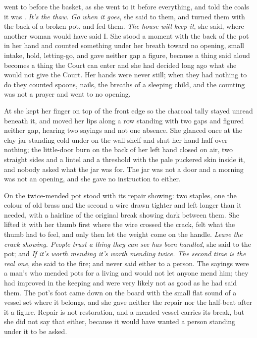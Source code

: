  went to  before the basket, as she went to it before everything, and told the coals it was . \emph{It's the thaw. Go when it goes}, she said to them, and turned them with the back of a broken pot, and fed them. \emph{The house will keep it}, she said, where another woman would have said I. She stood a moment with the back of the pot in her hand and counted something under her breath toward no opening, small intake, hold, letting-go, and gave neither gap a figure, because a thing said aloud becomes a thing the Court can enter and she had decided long ago what she would not give the Court. Her hands were never still; when they had nothing to do they counted spoons, nails, the breaths of a sleeping child, and the counting was not a prayer and went to no opening.

At  she kept her finger on top of the front edge so the charcoal tally stayed unread beneath it, and moved her lips along a row standing with two gaps and figured neither gap, hearing two sayings and not one absence. She glanced once at the clay jar standing cold under  on the wall shelf and shut her hand half over nothing; the little-door burn on the back of her left hand closed on air, two straight sides and a lintel and a threshold with the pale puckered skin inside it, and nobody asked what the jar was for. The jar was not a door and a morning was not an opening, and she gave no instruction to either.

On  the twice-mended pot stood with its repair showing: two staples, one the colour of old brass and the second a wire drawn tighter and left longer than it needed, with a hairline of the original break showing dark between them. She lifted it with her thumb first where the wire crossed the crack, felt what the thumb had to feel, and only then let the weight come on the handle. \emph{Leave the crack showing. People trust a thing they can see has been handled}, she said to the pot; and \emph{If it's worth mending it's worth mending twice. The second time is the real one}, she said to the fire; and never said either to a person. The sayings were a man's who mended pots for a living and would not let anyone mend him; they had improved in the keeping and were very likely not as good as he had said them. The pot's foot came down on the board with the small flat sound of a vessel set where it belongs, and she gave neither the repair nor the half-beat after it a figure. Repair is not restoration, and a mended vessel carries its break, but she did not say that either, because it would have wanted a person standing under it to be asked.

